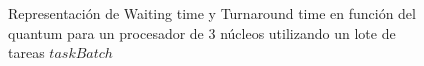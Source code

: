 \begin{figure}[H]
\hfill
{}
\hfill
{}
\hfill
\caption{Representación de Waiting time y Turnaround time en función del quantum para un procesador de 3 núcleos utilizando un lote de tareas $taskBatch$}
\end{figure}

